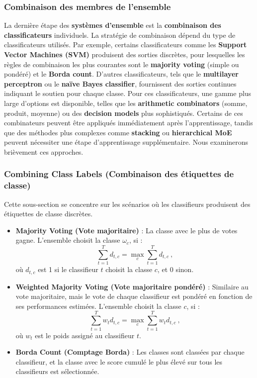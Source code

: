 \subsubsection{Combinaison des membres de l'ensemble}
La dernière étape des \textbf{systèmes d'ensemble} est la \textbf{combinaison des classificateurs} individuels. La stratégie de combinaison dépend du type de classificateurs utilisés. Par exemple, certains classificateurs comme les \textbf{Support Vector Machines (SVM)} produisent des sorties discrètes, pour lesquelles les règles de combinaison les plus courantes sont le \textbf{majority voting} (simple ou pondéré) et le \textbf{Borda count}. D'autres classificateurs, tels que le \textbf{multilayer perceptron} ou le \textbf{naïve Bayes classifier}, fournissent des sorties continues indiquant le soutien pour chaque classe. Pour ces classificateurs, une gamme plus large d'options est disponible, telles que les \textbf{arithmetic combinators} (somme, produit, moyenne) ou des \textbf{decision models} plus sophistiqués. Certains de ces combinateurs peuvent être appliqués immédiatement après l'apprentissage, tandis que des méthodes plus complexes comme \textbf{stacking} ou \textbf{hierarchical MoE} peuvent nécessiter une étape d'apprentissage supplémentaire. Nous examinerons brièvement ces approches.
\subsubsection*{Combining Class Labels (Combinaison des étiquettes de classe)}
Cette sous-section se concentre sur les scénarios où les classifieurs produisent des étiquettes de classe discrètes.

\begin{itemize}
	\item \textbf{Majority Voting (Vote majoritaire)} : La classe avec le plus de votes gagne. L'ensemble choisit la classe $\omega_c$, si :
	\[
	\sum_{t=1}^{T} d_{t,c} = \max_{c} \sum_{t=1}^{T} d_{t,c}~,
	\]
	où $d_{t,c}$ est 1 si le classifieur $t$ choisit la classe $c$, et 0 sinon.
	
	\item \textbf{Weighted Majority Voting (Vote majoritaire pondéré)} : Similaire au vote majoritaire, mais le vote de chaque classifieur est pondéré en fonction de ses performances estimées. L'ensemble choisit la classe $c$, si :
	\[
	\sum_{t=1}^{T} w_t d_{t,c} = \max_{c} \sum_{t=1}^{T} w_t d_{t,c}~,
	\]
	où $w_t$ est le poids assigné au classifieur $t$.
	
	\item \textbf{Borda Count (Comptage Borda)} : Les classes sont classées par chaque classifieur, et la classe avec le score cumulé le plus élevé sur tous les classifieurs est sélectionnée.
\end{itemize}

